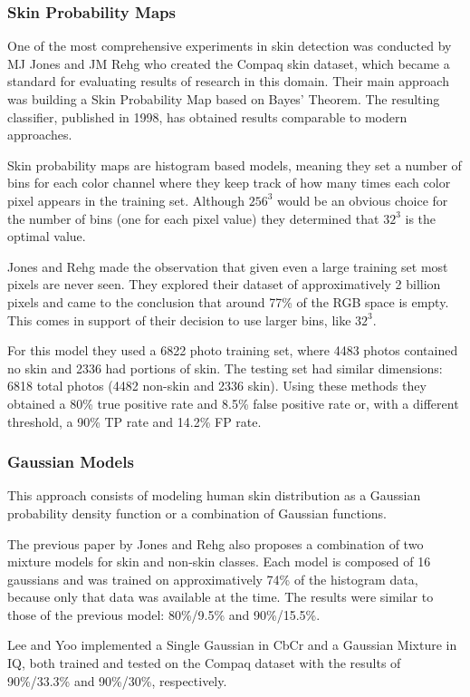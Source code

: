 \documentclass[12pt]{report}
\begin{document}
	\subsubsection{Skin Probability Maps}
	One of the most comprehensive experiments in skin detection was conducted by MJ Jones and JM Rehg\cite{compaq} who created the Compaq skin dataset, which became a standard for evaluating results of research in this domain. Their main approach was building a Skin Probability Map based on Bayes' Theorem. The resulting classifier, published in 1998, has obtained results comparable to modern approaches.
	
	Skin probability maps are histogram based models, meaning they set a number of bins for each color channel where they keep track of how many times each color pixel appears in the training set. Although \(256^3\) would be an obvious choice for the number of bins (one for each pixel value) they determined that \(32^3\) is the optimal value.
	
	Jones and Rehg\cite{compaq} made the observation that given even a large training set most pixels are never seen. They explored their dataset of approximatively 2 billion pixels and came to the conclusion that around 77\% of the RGB space is empty. This comes in support of their decision to use larger bins, like \(32^3\).
	
	For this model they used a 6822 photo training set, where 4483 photos contained no skin and 2336 had portions of skin. The testing set had similar dimensions: 6818 total photos (4482 non-skin and 2336 skin). Using these methods they obtained a 80\% true positive rate and 8.5\% false positive rate or, with a different threshold, a 90\% TP rate and 14.2\% FP rate.
	
	\subsubsection{Gaussian Models}
	This approach consists of modeling human skin distribution as a Gaussian probability density function or a combination of Gaussian functions.
	
	The previous paper\cite{compaq} by Jones and Rehg also proposes a combination of two mixture models for skin and non-skin classes. Each model is composed of 16 gaussians and was trained on approximatively 74\% of the histogram data, because only that data was available at the time. The results were similar to those of the previous model: 80\%/9.5\% and 90\%/15.5\%.
	
	Lee and Yoo\cite{gaussian_applied} implemented a Single Gaussian in CbCr and a Gaussian Mixture in IQ, both trained and tested on the Compaq dataset with the results of 90\%/33.3\% and 90\%/30\%, respectively.
	
\end{document}
